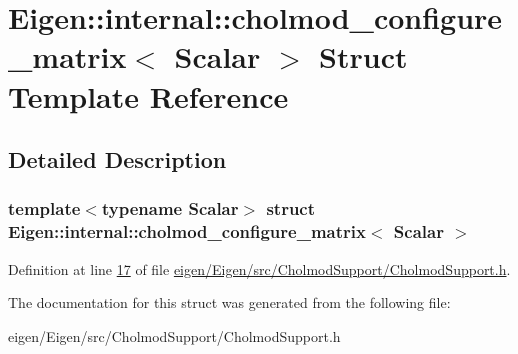 \hypertarget{struct_eigen_1_1internal_1_1cholmod__configure__matrix}{}\section{Eigen\+:\+:internal\+:\+:cholmod\+\_\+configure\+\_\+matrix$<$ Scalar $>$ Struct Template Reference}
\label{struct_eigen_1_1internal_1_1cholmod__configure__matrix}


\subsection{Detailed Description}
\subsubsection*{template$<$typename Scalar$>$\newline
struct Eigen\+::internal\+::cholmod\+\_\+configure\+\_\+matrix$<$ Scalar $>$}



Definition at line \hyperlink{eigen_2_eigen_2src_2_cholmod_support_2_cholmod_support_8h_source_l00017}{17} of file \hyperlink{eigen_2_eigen_2src_2_cholmod_support_2_cholmod_support_8h_source}{eigen/\+Eigen/src/\+Cholmod\+Support/\+Cholmod\+Support.\+h}.



The documentation for this struct was generated from the following file\+:\begin{DoxyCompactItemize}
\item 
eigen/\+Eigen/src/\+Cholmod\+Support/\+Cholmod\+Support.\+h\end{DoxyCompactItemize}
